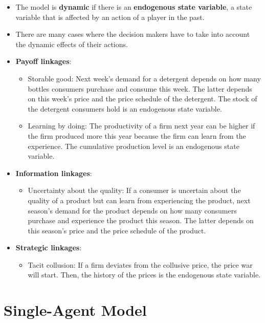 \documentclass[]{book}
\providecommand{\tightlist}{%
  \setlength{\itemsep}{0pt}\setlength{\parskip}{0pt}}
\begin{document}
\begin{itemize}
\tightlist
\item
  The model is \textbf{dynamic} if there is an \textbf{endogenous state
  variable}, a state variable that is affected by an action of a player
  in the past.
\item
  There are many cases where the decision makers have to take into
  account the dynamic effects of their actions.
\item
  \textbf{Payoff linkages}:

  \begin{itemize}
  \tightlist
  \item
    Storable good: Next week's demand for a detergent depends on how
    many bottles consumers purchase and consume this week. The latter
    depends on this week's price and the price schedule of the
    detergent. The stock of the detergent consumers hold is an
    endogenous state variable.
  \item
    Learning by doing: The productivity of a firm next year can be
    higher if the firm produced more this year because the firm can
    learn from the experience. The cumulative production level is an
    endogenous state variable.
  \end{itemize}
\item
  \textbf{Information linkages}:

  \begin{itemize}
  \tightlist
  \item
    Uncertainty about the quality: If a consumer is uncertain about the
    quality of a product but can learn from experiencing the product,
    next season's demand for the product depends on how many consumers
    purchase and experience the product this season. The latter depends
    on this season's price and the price schedule of the product.
  \end{itemize}
\item
  \textbf{Strategic linkages}:

  \begin{itemize}
  \tightlist
  \item
    Tacit collusion: If a firm deviates from the collusive price, the
    price war will start. Then, the history of the prices is the
    endogenous state variable.
  \end{itemize}
\end{itemize}

\section{Single-Agent Model}\label{single-agent-model}
\end{document}
